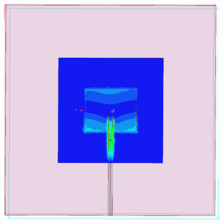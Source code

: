 \documentclass[10pt, a4paper]{article}%
\begin{document}
\begin{figure}[ht!]
\begin{minipage}{0.32\textwidth}
	\end{minipage}
	\hfill
	\begin{minipage}{0.32\textwidth}
		\centering
		\includegraphics[width= 1\textwidth]{EFIELD_coax.png}
	\end{minipage}
	\end{figure}
\end{document}
